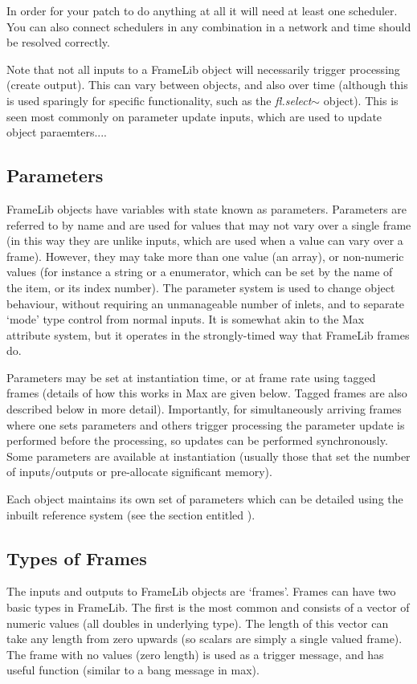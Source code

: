 \documentclass{article}
\newcommand{\flobject}[1]{\textit{fl.#1$\sim$}}
\begin{document}
In order for your patch to do anything at all it will need at least one scheduler. You can also connect schedulers in any combination in a network and time should be resolved correctly.

Note that not all inputs to a FrameLib object will necessarily trigger processing (create output). This can vary between objects, and also over time (although this is used sparingly for specific functionality, such as the \flobject{select} object). This is seen most commonly on parameter update inputs, which are used to update object paraemters....

\subsection{Parameters}

FrameLib objects have variables with state known as parameters. Parameters are referred to by name and are used for values that may not vary over a single frame  (in this way they are unlike inputs, which are used when a value can vary over a frame). However, they may take more than one value (an array), or non-numeric values (for instance a string or a enumerator, which can be set by the name of the item, or its index number). The parameter system is used to change object behaviour, without requiring an unmanageable number of inlets, and to separate `mode' type control from normal inputs. It is somewhat akin to the Max attribute system, but it operates in the strongly-timed way that FrameLib frames do.

Parameters may be set at instantiation time, or at frame rate using tagged frames (details of how this works in Max are given below. Tagged frames are also described below in more detail). Importantly, for simultaneously arriving frames where one sets parameters and others trigger processing the parameter update is performed before the processing, so updates can be performed synchronously. Some parameters are available at instantiation (usually those that set the number of inputs/outputs or pre-allocate significant memory).

Each object maintains its own set of parameters which can be detailed using the inbuilt reference system (see the section entitled ).

\subsection{Types of Frames}

The inputs and outputs to FrameLib objects are `frames'. Frames can have two basic types in FrameLib. The first is the most common and consists of a vector of numeric values (all doubles in underlying type). The length of this vector can take any length from zero upwards (so scalars are simply a single valued frame). The frame with no values (zero length) is used as a trigger message, and has useful function (similar to a bang message in max). 
\end{document}
